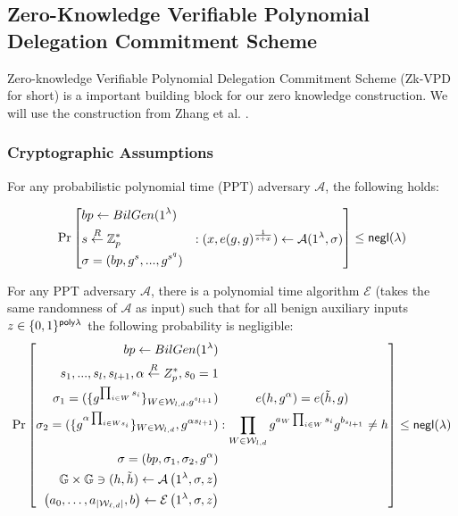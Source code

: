 
\subsection{Zero-Knowledge Verifiable Polynomial Delegation Commitment Scheme}

Zero-knowledge Verifiable Polynomial Delegation Commitment Scheme (Zk-VPD for short) is a important building block for our zero knowledge construction. We will use the construction from Zhang et al. \cite{zkvpd}.

\subsubsection{Cryptographic Assumptions}

\begin{assumption}
	\label{asp::qSDH}
	For any probabilistic polynomial time (PPT) adversary $\mathcal{A}$, the following holds:

	\[\Pr\left[ \begin{aligned}
		&bp \leftarrow BilGen(1^\lambda) & \\
		&s \overset{R}{\leftarrow} \mathbb{Z}^{*}_{p} & : (x, e(g, g)^{\frac{1}{s+x}}) \leftarrow \mathcal{A}(1^\lambda, \sigma)\\
		&\sigma = (bp, g^s, ..., g^{s^q})
	\end{aligned} \right] \le {\sf negl}{(\lambda)}\]
\end{assumption}
\begin{assumption}
	\label{asp::dlEPKE}
	For any PPT adversary $\mathcal{A}$, there is a polynomial time algorithm $\mathcal{E}$ (takes the same randomness of $\mathcal{A}$ as input) such that for all benign auxiliary inputs $z \in \{0,1\}^{{\sf poly}{\lambda}}$ the following probability is negligible:
	\[\Pr\left[ \begin{aligned}
					bp \leftarrow BilGen(1^\lambda) & \\
					s_1, ..., s_l, s_{l + 1}, \alpha \overset{R}{\leftarrow} Z_{p}^*, s_0=1 & \\
					\sigma_1 = (\{g^{\prod_{i\in W}s_i}\}_{W\in \mathcal{W}_{l, d}, g^{s_{l+1}}}) &\hspace*{30pt} e(h, g^\alpha)=e(\tilde{h}, g)\\
					\sigma_2 = (\{g^{\alpha\prod_{i\in Ws_i}}\}_{W\in \mathcal{W}_{l, d}}, g^{\alpha s_{l+1}}) & : \prod_{W\in \mathcal{W}_{l, d}}g^{a_{W}\prod_{i\in W}s_i}g^{b_{s_{l+1}}}\neq h\\
					\sigma = (bp, \sigma_1, \sigma_2, g^{\alpha}) & \\
					\mathbb{G} \times \mathbb{G} \ni (h, \tilde{h}) \leftarrow \mathcal{A} \left(1^{\lambda}, \sigma, z\right)& \\
					\left( a _ { 0 } , \dots , a _ { \left| \mathcal { W } _ { \ell , d } \right| } , b \right) \leftarrow \mathcal { E } \left( 1 ^ { \lambda } , \sigma , z \right) &
				\end{aligned}\right] \le {\sf negl}{(\lambda)}\]
\end{assumption}

